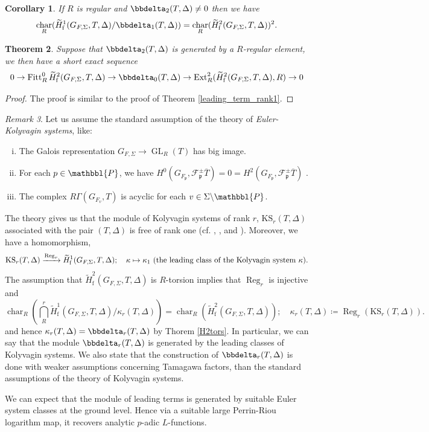 \documentclass[10pt]{amsart}
\numberwithin{equation}{section}
\newtheorem{thm}{Theorem}[section]
\newtheorem{cor}[thm]{Corollary}
\theoremstyle{definition}
\theoremstyle{remark} %
\newtheorem{rmk}[thm]{Remark}
\newcommand{\mrm}{\mathrm}
\newcommand{\ba}{\backslash}
\DeclareMathOperator{\Char}{char}
\newcommand{\Ext}{\operatorname{Ext}}
\newcommand{\Fitt}{\operatorname{Fitt}}
\newcommand{\GL}[1]{\operatorname{GL}_{#1}}
\newcommand{\scrF}{\mathscr{F}}
\newcommand{\G}{G_{F,\Sigma}}
\newcommand{\p}{\mathfrak{p}}
\newcommand{\bP}{\mathbbl{P}}
\newcommand{\cohom}{\widetilde{H}_{\mathrm{f}}}
\begin{document}
		\begin{cor}
			\label{r2}
			If $ R $ is regular and $ \bbdelta_2(T,\Delta) \ne 0 $ then we have $$\Char_R(\widetilde{H}^1_{\mathrm{f}}(G_{F,\Sigma},T,\Delta)/\bbdelta_1(T,\Delta)) =  \Char_R(\widetilde{H}^2_{\mathrm{f}}(G_{F,\Sigma},T,\Delta))^2.$$
		\end{cor}
		\begin{thm}
			\label{nontorsion}
			Suppose that $\bbdelta_2(T, \Delta)$ is generated by a $R$-regular element, we then have a short exact sequence  
			\begin{equation*}
				0 \rightarrow \Fitt^0_R \widetilde{H}^2_{\mathrm{f}}(G_{F,\Sigma},T,\Delta) \rightarrow \bbdelta_0(T, \Delta) \rightarrow \Ext^2_R(\widetilde{H}^2_{\mathrm{f}}(G_{F,\Sigma},T,\Delta),R) \rightarrow 0
			\end{equation*}
		\end{thm}
		\begin{proof}
			The proof is similar to the proof of Theorem \ref{leading_term_rank1}.
		\end{proof}
		\begin{rmk}
			\label{koly_ralation}
			Let us assume the standard assumption of the theory of \emph{Euler-Kolyvagin systems}, like:
			\begin{enumerate}[(i)]
				\item The Galois representation $ \G \to \GL{R}(T) $ has big image.
				\item For each $ p \in \bP $, we have $H^0(G_{F_{\p}}, \scrF^{\pm}_{\p}\overline{T}) = 0 =H^2(G_{F_{\p}}, \scrF^{\pm}_{\p}\overline{T}) $ .
				\item The complex $ R\Gamma(G_{F_v},T) $ is acyclic for each $ v \in \Sigma \ba \bP $.
			\end{enumerate}
			The theory gives us that the module of Kolyvagin systems of rank $ r $, $ \mrm{KS}_r(T,\Delta) $ associated with the pair $ (T,\Delta) $ is free of rank one (cf. \cite[Theorem 5.2.10]{MR_kolysys}, \cite[Theorem A]{kazim_kolysys}, and \cite[Theorem 5.2]{BSS18}). Moreover, we have a homomorphism,
			\[ \mrm{KS}_r(T,\Delta) \xrightarrow{\operatorname{Reg}_r} \cohom^1(\G,T,\Delta); \quad \kappa \mapsto \kappa_1 \ \text{(the leading class of the Kolyvagin system $ \kappa $)}. \]
			The assumption that $ \cohom^2(\G,T,\Delta) $ is $ R $-torsion implies that $ \operatorname{Reg}_r $ is injective and 
			\[ \Char_R(\bigcap_R^r\cohom^1(\G,T,\Delta)/ \kappa_r(T,\Delta)) = \Char_R(\cohom^2(\G,T,\Delta)); \quad \kappa_r(T,\Delta)\coloneqq \operatorname{Reg}_r(\mrm{KS}_r(T,\Delta)). \]
			and hence $ \kappa_r(T,\Delta) = \bbdelta_r(T,\Delta) $ by Thorem \ref{H2tors}. In particular, we can say that the module $ \bbdelta_r(T,\Delta) $ is generated by the leading classes of Kolyvagin systems. We also state that the construction of $ \bbdelta_r(T,\Delta) $ is done with weaker assumptions concerning Tamagawa factors, than the standard assumptions of the theory of Kolyvagin systems. 
			
			We can expect that the module of leading terms is generated by suitable Euler system classes at the ground level. Hence via a suitable large Perrin-Riou logarithm map, it recovers analytic $ p $-adic $ L $-functions.
		\end{rmk}
\end{document}
